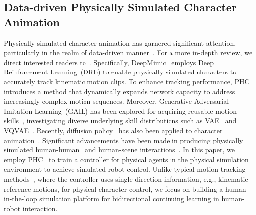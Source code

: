 \subsection{Data-driven Physically Simulated Character Animation} 
Physically simulated character animation has garnered significant attention, particularly in the realm of data-driven manner~\cite{peng2018deepmimic, fussell2021supertrack, bergamin2019drecon, peng2022ase, won2020scalable}. For a more in-depth review, we direct interested readers to~\cite{kwiatkowski2022survey}. Specifically, DeepMimic~\cite{peng2018deepmimic} employs Deep Reinforcement Learning~(DRL) to enable physically simulated characters to accurately track kinematic motion clips. To enhance tracking performance, PHC~\cite{luo2023perpetual} introduces a method that dynamically expands network capacity to address increasingly complex motion sequences. Moreover, Generative Adversarial Imitation Learning~(GAIL) has been explored for acquiring reusable motion skills~\cite{peng2021amp, bae2023pmp, peng2022ase, dou2023c, tessler2023calm}, investigating diverse underlying skill distributions such as VAE~\cite{yao2022controlvae} and VQVAE~\cite{yao2024moconvq, zhu2023neural}. Recently, diffusion policy~\cite{chi2023diffusion} has also been applied to character animation~\cite{truong2024pdp}. Significant advancements have been made in producing physically simulated human-human~\cite{won2021control, zhang2023simulation} and human-scene interactions~\cite{hassan2023synthesizing, wang2024sims, pan2024synthesizing, xiao2023unified}. In this paper, we employ PHC~\cite{luo2023perpetual} to train a controller for physical agents in the physical simulation environment to achieve simulated robot control. Unlike typical motion tracking methods~\cite{luo2023perpetual,peng2018deepmimic,fussell2021supertrack}, where the controller uses single-direction information, e.g., kinematic reference motions, for physical character control, we focus on building a human-in-the-loop simulation platform for bidirectional continuing learning in human-robot interaction.

